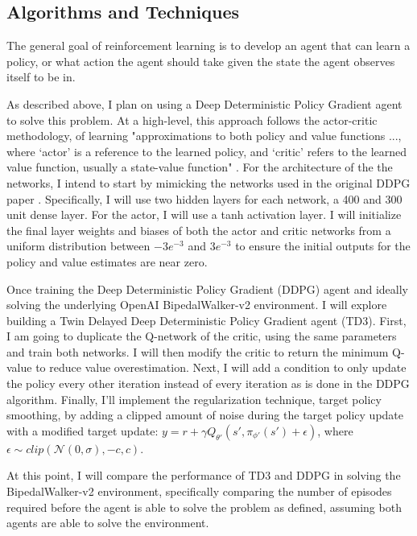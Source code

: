 \documentclass{article}
\begin{document}
\subsection{Algorithms and Techniques}
The general goal of reinforcement learning is to develop an agent that can learn a policy, or what action the agent should take given the state the agent observes itself to be in. 


As described above, I plan on using a Deep Deterministic Policy Gradient agent to solve this problem. At a high-level, this approach follows the actor-critic methodology, of learning "approximations to both policy and value functions ..., where ‘actor’ is a reference to the learned policy, and ‘critic’ refers to the learned value function, usually a state-value function" \cite{Sutton:2018:RLI:3312046}. For the architecture of the the networks, I intend to start by mimicking the networks used in the original DDPG paper \cite{DBLP:journals/corr/LillicrapHPHETS15}. Specifically, I will use two hidden layers for each network, a 400 and 300 unit dense layer. For the actor, I will use a tanh activation layer. I will initialize the final layer weights and biases of both the actor and critic networks from a uniform distribution between $-3e^{-3}$ and $3e^{-3}$ to ensure the initial outputs for the policy and value estimates are near zero. 

Once training the Deep Deterministic Policy Gradient (DDPG) agent and ideally solving the underlying OpenAI BipedalWalker-v2 environment. I will explore building a Twin Delayed Deep Deterministic Policy Gradient agent (TD3). First, I am going to duplicate the Q-network of the critic, using the same parameters and train both networks. I will then modify the critic to return the minimum Q-value to reduce value overestimation. Next, I will add a condition to only update the policy every other iteration instead of every iteration as is done in the DDPG algorithm. Finally, I'll implement the regularization technique, target policy smoothing, by adding a clipped amount of noise during the target policy update with a modified target update: $y=r+\gamma Q_{\theta'} (s', \pi_{\phi'}(s')+ \epsilon)$, where $\epsilon \sim clip(\mathcal{N}(0, \sigma), -c, c)$.

At this point, I will compare the performance of TD3 and DDPG in solving the BipedalWalker-v2 environment, specifically comparing the number of episodes required before the agent is able to solve the problem as defined, assuming both agents are able to solve the environment.
\end{document}
